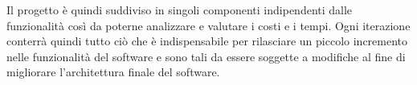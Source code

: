 Il progetto è quindi suddiviso in singoli componenti indipendenti dalle funzionalità così da poterne analizzare e valutare i costi e i tempi. Ogni iterazione conterrà quindi tutto ciò che è indispensabile per rilasciare un piccolo incremento nelle funzionalità del software e sono tali da essere soggette a modifiche al fine di migliorare l'architettura finale del software.
% 
% 
% 
% 
% 
% 
